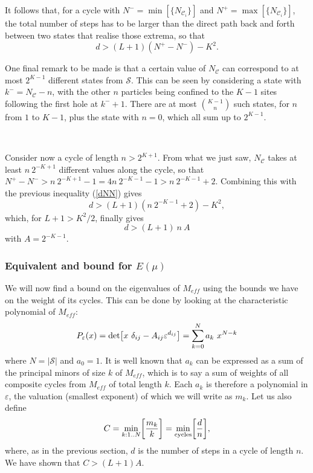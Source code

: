 \documentclass[aps,pre,onecolumn,showpacs,showkeys,a4paper]{revtex4-1}
\begin{document}
It follows that, for a cycle with $N^-=\min[\{N_{\mathcal{C}_i}\}]$ and $N^+=\max[\{N_{\mathcal{C}_i}\}]$, the total number of steps has to be larger than the direct path back and forth between two states that realise those extrema, so that
\begin{equation}\label{dNN}\boxed{
d>(L+1)(N^+-N^-)-K^2.
}\end{equation}



One final remark to be made is that a certain value of $N_{\mathcal{C}}$ can correspond to at most $2^{K-1}$ different states from $\mathcal{S}$. This can be seen by considering a state with $k^-=N_{\mathcal{C}}-n$, with the other $n$ particles being confined to the $K-1$ sites following the first hole at $k^-+1$. There are at most ${K-1 \choose n}$ such states, for $n$ from $1$ to $K-1$, plus the state with $n=0$, which all sum up to $2^{K-1}$.

~~


Consider now a cycle of length $n>2^{K+1}$. From what we just saw, $N_{\mathcal{C}}$ takes at least $n~2^{-K+1}$ different values along the cycle, so that $N^+-N^->n~2^{-K+1}-1=4n~2^{-K-1}-1>n~2^{-K-1}+2$. Combining this with the previous inequality (\ref{dNN}) gives
\begin{equation}
d>(L+1)(n~2^{-K-1}+2)-K^2,
\end{equation}
which, for $L+1>K^2/2$, finally gives
\begin{equation}\boxed{
d>(L+1) ~n~A
}\end{equation}
with $A=2^{-K-1}$.







\subsubsection{Equivalent and bound for $E(\mu)$}
\label{IVc3}

We will now find a bound on the eigenvalues of $M_{eff}$ using the bounds we have on the weight of its cycles. This can be done by looking at the characteristic polynomial of $M_{eff}$:
\begin{equation}
P_\varepsilon(x)={\rm det}\bigl[x~\delta_{ij} -A_{ij}\varepsilon^{d_{ij}} \bigr]=\sum_{k=0}^{N} a_k~x^{N-k}
\end{equation}
where $N=|\mathcal{S}|$ and $a_0=1$. It is well known that $a_k$ can be expressed as a sum of the principal minors of size $k$ of $M_{eff}$, which is to say a sum of weights of all composite cycles from $M_{eff}$ of total length $k$. Each $a_k$ is therefore a polynomial in $\varepsilon$, the valuation (smallest exponent) of which we will write as $m_k$. Let us also define
\begin{equation}\label{mindn}
C= \min_{k:1..N}\biggl[\frac{m_{k}}{k}\biggr]=\min_{\rm cycles}\biggl[\frac{d}{n}\biggr],
\end{equation}
where, as in the previous section, $d$ is the number of steps in a cycle of length $n$. We have shown that $C>(L+1)A$.
\end{document}

